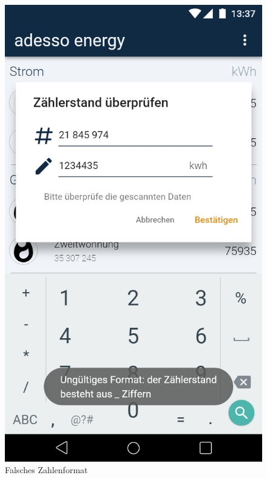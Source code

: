 \begin{figure}[h]
	\includegraphics[scale = 0.22]{img/AndroidMockup/illegalFormatException}		
	\caption{Falsches Zahlenformat}
	\label{fig:mock-pw}
\end{figure}


